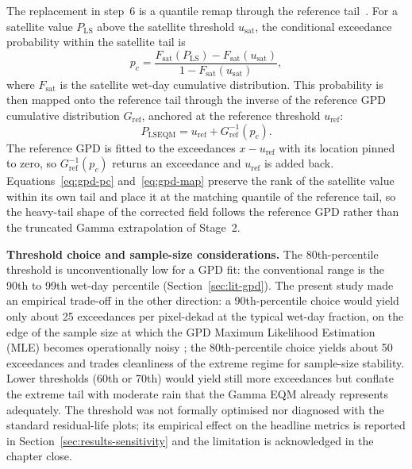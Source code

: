 The replacement in step~6 is a quantile remap through the
reference tail~\citep{ref:gudmundsson2012}. For a satellite value $P_{\text{LS}}$ above the
satellite threshold $u_{\text{sat}}$, the conditional exceedance
probability within the satellite tail is
\begin{equation}
p_c = \frac{F_{\text{sat}}(P_{\text{LS}}) - F_{\text{sat}}(u_{\text{sat}})}
           {1 - F_{\text{sat}}(u_{\text{sat}})},
\label{eq:gpd-pc}
\end{equation}
where $F_{\text{sat}}$ is the satellite wet-day cumulative
distribution. This probability is then mapped onto the reference
tail through the inverse of the reference GPD cumulative
distribution $G_{\text{ref}}$, anchored at the reference
threshold $u_{\text{ref}}$:
\begin{equation}
P_{\text{LSEQM}} = u_{\text{ref}} + G_{\text{ref}}^{-1}(p_c).
\label{eq:gpd-map}
\end{equation}
The reference GPD is fitted to the exceedances
$x - u_{\text{ref}}$ with its location pinned to zero, so
$G_{\text{ref}}^{-1}(p_c)$ returns an exceedance and
$u_{\text{ref}}$ is added back.
Equations~\eqref{eq:gpd-pc} and~\eqref{eq:gpd-map} preserve the
rank of the satellite value within its own tail and place it at
the matching quantile of the reference tail, so the heavy-tail
shape of the corrected field follows the reference GPD rather
than the truncated Gamma extrapolation of Stage~2.

\medskip\noindent\textbf{Threshold choice and sample-size considerations.}
The 80th-percentile threshold is unconventionally low for a GPD
fit: the conventional range is the 90th to 99th wet-day
percentile (Section~\ref{sec:lit-gpd}). The present study made an empirical
trade-off in the other direction: a 90th-percentile choice would
yield only about 25 exceedances per pixel-dekad at the typical
wet-day fraction, on the edge of the sample size at which the
GPD Maximum Likelihood Estimation (MLE) becomes operationally noisy \citep{ref:hoskingwallis1987};
the 80th-percentile choice yields about 50 exceedances and
trades cleanliness of the extreme regime for sample-size
stability. Lower thresholds (60th or 70th) would yield still
more exceedances but conflate the extreme tail with moderate
rain that the Gamma EQM already represents adequately. The
threshold was not formally optimised nor diagnosed with the
standard residual-life plots; its empirical effect on the
headline metrics is reported in
Section~\ref{sec:results-sensitivity} and the limitation is
acknowledged in the chapter close.

